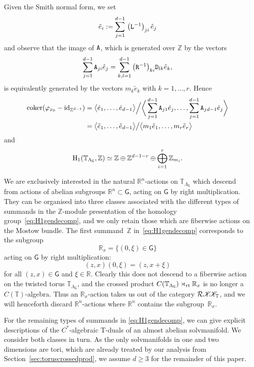 \documentclass[10pt,a4paper]{amsart}
\numberwithin{equation}{section}
\newcommand{\Z}{\zed}
\newcommand{\CCK}{\mathscr{K}}
\newcommand{\sfG}{\mathsf{G}}
\newcommand{\rt}{{\rm rt}}
\newcommand{\R}{\real}
\newcommand{\zed}{{\mathbb Z}} %
\newcommand{\real}{{\mathbb R}} %
\newcommand{\torus}{{\mathbb T}} %
\begin{document}
Given the Smith normal form, we set
\begin{gather}\label{eq:tildeei}
\tilde e_i:=\sum_{j=1}^{d-1}\,\big({\tt L}^{-1}\big)_{ji}\,\hat e_j
\end{gather}
and observe that
the image of $\tt A$, which is generated over $\zed$ by the vectors
\[
\sum_{j=1}^{d-1} {\tt A}_{ji} \hat e_j=\sum_{k,l=1}^{d-1} \big({\tt
 R}^{-1}\big)_{ki} {\tt
 D}_{lk} \tilde e_k ,
\]
is equivalently generated by the
vectors $m_k \tilde e_k$ with $k=1,\ldots, r$.
Hence
\begin{align*}
{\rm{coker}}(\varphi_{x_0}-{\rm{id}}_{\Z^{d-1}})&=\big\langle \hat e_1, \ldots , \hat
e_{d-1}\big\rangle\Big/\bigg\langle \sum\limits_{j=1}^{d-1} {\tt A}_{j1} \hat e_j,\ldots,
 \sum\limits_{j=1}^{d-1} {\tt A}_{j\:\!d-1} \hat e_j\bigg\rangle\\
&=\big\langle \tilde e_1,
\ldots , \tilde e_{d-1}\big\rangle\big/\big\langle m_1 \tilde e_1,\ldots, m_r \tilde
e_r\big\rangle
\end{align*}
and
\begin{gather}\label{eq:H1gendecomp}
{\rm H}_1(\torus_{\Lambda_\sfG},\zed) \simeq \zed \oplus
\zed^{d-1-r} \oplus \bigoplus_{i=1}^r \zed_{m_i} .
\end{gather}

We are exclusively
interested in the natural $\R^n$-actions on $\torus_{\Lambda_\sfG}$ which descend
from actions of abelian subgroups $\R^n\subset\sfG$, acting on $\sfG$
by right multiplication. They can be
organised into three classes associated with the different types of
summands in the $\Z$-module presentation of the homology group~\eqref{eq:H1gendecomp}, and we only retain those which are fiberwise
actions on the Mostow bundle.
The first summand~$\Z$ in~\eqref{eq:H1gendecomp} corresponds to the subgroup
\[
\R_x = \big\{(0,\xi)\in\sfG\big\}
\]
acting on $\sfG$ by right multiplication:
\[
(z,x) (0,\xi) = (z,x+\xi)
\]
for all $(z,x)\in\sfG$ and $\xi\in\R$. Clearly this does not descend
to a fiberwise
action on the twisted torus $\torus_{\Lambda_\sfG}$, and the crossed
product $C(\torus_{\Lambda_\sfG})\rtimes_\rt\R_x$ is no longer a
$C(\torus)$-algebra. Thus an $\R_x$-action takes us out of the
category $\mathcal{R}\CCK\hspace{-1mm}\CCK_\torus$, and we will henceforth
discard $\R^n$-actions where $\R^n$ contains the subgroup~$\R_x$.

For the remaining types of summands in \eqref{eq:H1gendecomp}, we can
give explicit descriptions of the $C^*$-algebraic T-duals of an almost
abelian solvmanifold. We consider both classes in turn. As the only solvmanifolds in one and two dimensions are tori, which are
already treated by our analysis from
Section~\ref{sec:toruscrossedprod}, we assume $d\geq3$ for the
remainder of this paper.
\end{document}
